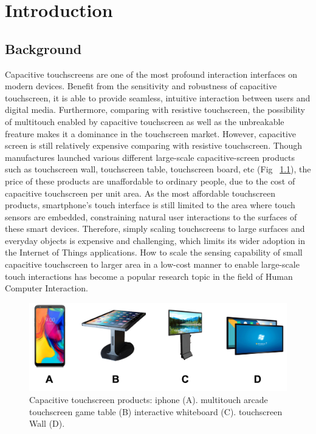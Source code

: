 \chapter{Introduction}

\section{Background}
Capacitive touchscreens are one of the most profound interaction interfaces on modern devices. Benefit from the sensitivity and robustness of capacitive touchscreen, it is able to provide seamless, intuitive interaction between users and digital media. Furthermore, comparing with resistive touchscreen, the possibility of multitouch enabled by capacitive touchscreen as well as the unbreakable freature makes it a dominance in the touchscreen market. However, capacitive screen is still relatively expensive comparing with resistive touchscreen. Though manufactures launched various different large-scale capacitive-screen products such as touchscreen wall, touchscreen table, touchscreen board, etc (Fig ~\ref{fig:touchscreen-products}), the price of these products are unaffordable to ordinary people, due to the cost of capacitive touchscreen per unit area. As the most affordable touchscreen products, smartphone's touch interface is still limited to the area where touch sensors are embedded, constraining natural user interactions to the surfaces of these smart devices. Therefore, simply scaling touchscreens to large surfaces and everyday objects is expensive and challenging, which limits its wider adoption in the Internet of Things applications. How to scale the sensing capability of small capacitive touchscreen to larger area in a low-cost manner to enable large-scale touch interactions has become a popular research topic in the field of Human Computer Interaction.

\begin{figure}[ht]
  \centering
    \includegraphics[width=0.8\columnwidth]{figures/touchproducts.png}
    \setlength{\belowcaptionskip}{-8pt}
    \caption{Capacitive touchscreen products: iphone (A). multitouch arcade touchscreen game table (B) interactive whiteboard (C). touchscreen Wall (D).}
    \label{fig:touchscreen-products}
\end{figure}

